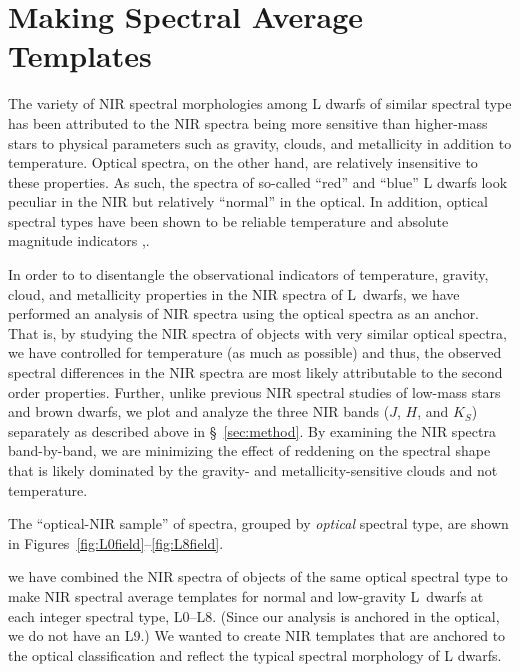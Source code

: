 \documentclass[12pt,preprint]{aastex}
\newcommand{\sample}{180}
\begin{document}
\section{Making Spectral Average Templates}
\label{sec:templates}

The variety of NIR spectral morphologies among L dwarfs of similar spectral type has been attributed to the NIR spectra being more sensitive than higher-mass stars to physical parameters such as gravity, clouds, and metallicity in addition to temperature.
Optical spectra, on the other hand, are relatively insensitive to these properties. As such, the spectra of so-called ``red'' and ``blue'' L dwarfs look peculiar in the NIR but relatively ``normal'' in the optical. 
In addition, optical spectral types have been shown to be reliable temperature and absolute magnitude indicators \cite[Figure 7 and 9]{Kirkpatrick05},\cite{Faherty:2012cy}. 

In order to to disentangle the observational indicators of temperature, gravity, cloud, and metallicity properties in the NIR spectra of L~dwarfs, we have performed an analysis of NIR spectra using the optical spectra as an anchor.
That is, by studying the NIR spectra of objects with very similar optical spectra, we have controlled for temperature (as much as possible) and thus, the observed spectral differences in the NIR spectra are most likely attributable to the second order properties.
Further, unlike previous NIR spectral studies of low-mass stars and brown dwarfs, we plot and analyze the three NIR bands ($J$, $H$, and $K_S$) separately as described above in \S~\ref{sec:method}.
By examining the NIR spectra band-by-band, we are minimizing the effect of reddening on the spectral shape that is likely dominated by the gravity- and metallicity-sensitive clouds and not temperature.

The ``optical-NIR sample'' of spectra, grouped by \emph{optical} spectral type, are shown in Figures~\ref{fig:L0field}--\ref{fig:L8field}. 

 we have combined the NIR spectra of objects of the same optical spectral type to make NIR spectral average templates for normal and low-gravity L~dwarfs at each integer spectral type, L0--L8. (Since our analysis is anchored in the optical, we do not have an L9.) 
We wanted to create NIR templates that are anchored to the optical classification and reflect the typical spectral morphology of L dwarfs. 
\end{document}
